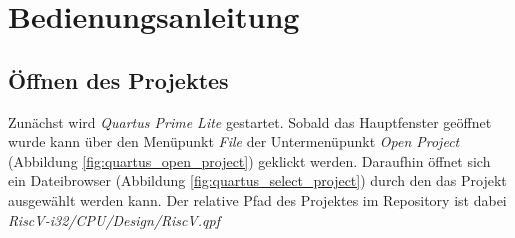\chapter{Bedienungsanleitung}

    \section{Öffnen des Projektes}
        Zunächst wird \textit{Quartus Prime Lite} gestartet.
        Sobald das Hauptfenster geöffnet wurde kann über den Menüpunkt \textit{File}
        der Untermenüpunkt \textit{Open Project} (Abbildung \ref{fig:quartus_open_project})
        geklickt werden. Daraufhin öffnet sich ein Dateibrowser (Abbildung \ref{fig:quartus_select_project})
        durch den das Projekt ausgewählt werden kann.
        Der relative Pfad des Projektes im Repository ist dabei \textit{RiscV-i32/CPU/Design/RiscV.qpf}
        
